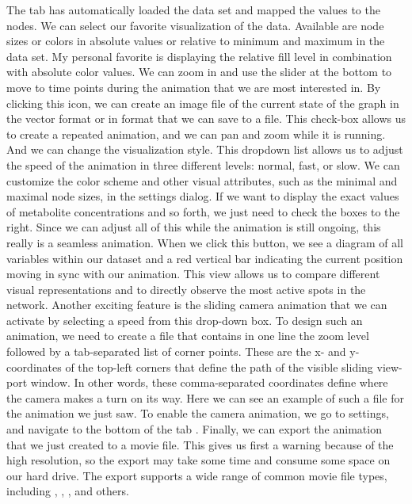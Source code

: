 The  tab has automatically loaded the data set and mapped the values to the nodes. 
We can select our favorite visualization of the data. Available are node sizes or colors in absolute values or relative to minimum and maximum in the data set.
My personal favorite is displaying the relative fill level in combination with absolute color values.
We can zoom in and use the slider at the bottom to move to time points during the animation that we are most interested in.
By clicking this icon, we can create an image file of the current state of the graph in the vector format \SVG or in \PNG format that we can save to a file.
This check-box allows us to create a repeated animation, and we can pan and zoom while it is running. And we can change the visualization style.
This dropdown list allows us to adjust the speed of the animation in three different levels: normal, fast, or slow.
We can customize the color scheme and other visual attributes, such as the minimal and maximal node sizes, in the settings dialog.
If we want to display the exact values of metabolite concentrations and so forth, we just need to check the boxes to the right.
Since we can adjust all of this while the animation is still ongoing, this really is a seamless animation.
When we click this button, we see a diagram of all variables within our dataset and a red vertical bar indicating the current position moving in sync with our animation.
This view allows us to compare different visual representations and to directly observe the most active spots in the network.
Another exciting feature is the sliding camera animation that we can activate by selecting a speed from this drop-down box.
To design such an animation, we need to create a \CSV file that contains in one line the zoom level followed by a tab-separated list of corner points.
These are the x- and y-coordinates of the top-left corners that define the path of the visible sliding view-port window.
In other words, these comma-separated coordinates define where the camera makes a turn on its way.
Here we can see an example of such a file for the animation we just saw.
To enable the camera animation, we go to settings, and navigate to the bottom of the tab .
Finally, we can export the animation that we just created to a movie file.
This gives us first a warning because of the high resolution, so the export may take some time and consume some space on our hard drive.
The export supports a wide range of common movie file types, including \AVI, \MOV, \MPG, and others.


